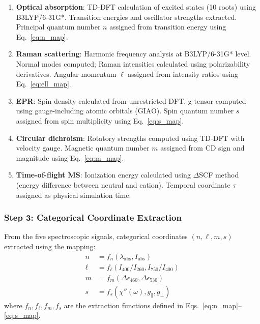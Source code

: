 \documentclass[twocolumn,10pt]{article}
\begin{document}
\begin{enumerate}
\item \textbf{Optical absorption}: TD-DFT calculation of excited states (10 roots) 
using B3LYP/6-31G*. Transition energies and oscillator strengths extracted. 
Principal quantum number $n$ assigned from transition energy using Eq.~\ref{eq:n_map}.

\item \textbf{Raman scattering}: Harmonic frequency analysis at B3LYP/6-31G* 
level. Normal modes computed; Raman intensities calculated using polarizability 
derivatives. Angular momentum $\ell$ assigned from intensity ratios using 
Eq.~\ref{eq:ell_map}.

\item \textbf{EPR}: Spin density calculated from unrestricted DFT. g-tensor 
computed using gauge-including atomic orbitals (GIAO). Spin quantum number $s$ 
assigned from spin multiplicity using Eq.~\ref{eq:s_map}.

\item \textbf{Circular dichroism}: Rotatory strengths computed using TD-DFT 
with velocity gauge. Magnetic quantum number $m$ assigned from CD sign and 
magnitude using Eq.~\ref{eq:m_map}.

\item \textbf{Time-of-flight MS}: Ionization energy calculated using 
$\Delta$SCF method (energy difference between neutral and cation). Temporal 
coordinate $\tau$ assigned as physical simulation time.
\end{enumerate}

\subsubsection{Step 3: Categorical Coordinate Extraction}

From the five spectroscopic signals, categorical coordinates $(n, \ell, m, s)$ 
extracted using the mapping:
%
\begin{align}
n &= f_n(\lambda_{\text{abs}}, I_{\text{abs}}) \label{eq:n_map} \\
\ell &= f_\ell(I_{400}/I_{260}, I_{750}/I_{400}) \label{eq:ell_map} \\
m &= f_m(\Delta \epsilon_{460}, \Delta \epsilon_{530}) \label{eq:m_map} \\
s &= f_s(\chi''(\omega), g_\parallel, g_\perp) \label{eq:s_map}
\end{align}
%
where $f_n, f_\ell, f_m, f_s$ are the extraction functions defined in 
Eqs.~\ref{eq:n_map}--\ref{eq:s_map}.
\end{document}

